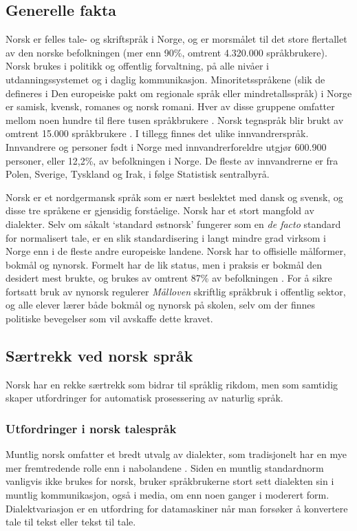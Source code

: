 \begin{multicols}{2}

\subsection{Generelle fakta}

Norsk er felles tale- og skriftspråk i Norge, og er morsmålet til det store flertallet av den norske befolkningen (mer enn 90\%, omtrent 4.320.000 språkbrukere). 
Norsk brukes i politikk og offentlig forvaltning, på alle nivåer i utdanningssystemet og i daglig kommunikasjon. 
Minoritetsspråkene (slik de defineres i Den europeiske pakt om regionale språk eller mindretallsspråk) i Norge er samisk, kvensk, romanes og norsk romani. Hver av disse gruppene omfatter mellom noen hundre til flere tusen språkbrukere \cite{stm35:2008}. 
Norsk tegnspråk blir brukt av omtrent 15.000 språkbrukere \cite{Erl:2007}. 
I tillegg finnes det ulike innvandrerspråk. 
Innvandrere og personer født i Norge med innvandrerforeldre utgjør 600.900 personer, eller 12,2\%, av befolkningen i Norge. De fleste av innvandrerne er fra Polen, Sverige, Tyskland og Irak, i følge Statistisk sentralbyrå.

Norsk er et nordgermansk språk som er nært beslektet med dansk og svensk, og disse tre språkene er gjensidig forståelige. 
Norsk har et stort mangfold av dialekter. 
Selv om såkalt `standard østnorsk' fungerer som en \textit{de facto} standard for normalisert tale, er en slik standardisering i langt mindre grad virksom i Norge enn i de fleste andre europeiske landene.
Norsk har to offisielle målformer, bokmål og nynorsk. Formelt har de lik status, men i praksis er bokmål den desidert mest brukte, og brukes av omtrent 87\% av befolkningen \cite{stm35:2008}. 
For å sikre fortsatt bruk av nynorsk regulerer \textit{Målloven} skriftlig språkbruk i offentlig sektor, og alle elever lærer både bokmål og nynorsk på skolen, selv om der finnes politiske bevegelser som vil avskaffe dette kravet.

\subsection{Særtrekk ved norsk språk}

Norsk har en rekke særtrekk som bidrar til språklig rikdom, men som samtidig skaper utfordringer for automatisk prosessering av naturlig språk.

\subsubsection{Utfordringer i norsk talespråk}
Muntlig norsk omfatter et bredt utvalg av dialekter, som tradisjonelt har en mye mer fremtredende rolle enn i nabolandene \cite{stm35:2008}.
Siden en muntlig standardnorm vanligvis ikke brukes for norsk, bruker språkbrukerne stort sett dialekten sin i muntlig kommunikasjon, også i media, om enn noen ganger i moderert form. 
Dialektvariasjon er en utfordring for datamaskiner når man forsøker å konvertere tale til tekst eller tekst til tale.


\end{multicols}
